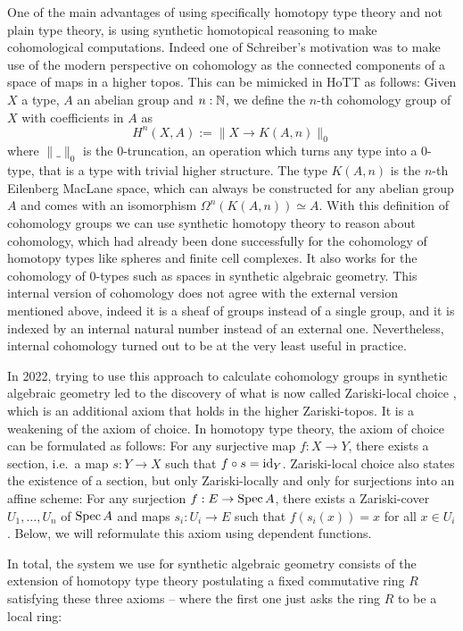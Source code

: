 One of the main advantages of using specifically homotopy type theory and not plain type theory, is using synthetic homotopical reasoning to make cohomological computations. Indeed one of Schreiber's motivation was to make use of the modern perspective on cohomology as the connected components of a space of maps in a higher topos. This can be mimicked in HoTT as follows: Given $X$ a type, $A$ an abelian group and $n:\mathbb{N}$, we define the $n$-th cohomology group of $X$ with coefficients in $A$ as
\[ H^n(X,A):=\| X\to K(A,n) \|_0\]
 where $\|\_\|_0$ is the $0$-truncation, an operation which turns any type into a $0$-type, that is a type with trivial higher structure. The type $K(A,n)$ is the $n$-th Eilenberg MacLane space, which can always be constructed for any abelian group $A$ and comes with an isomorphism $\Omega^n(K(A,n))\simeq A$.
With this definition of cohomology groups we can use synthetic homotopy theory to reason about cohomology, which had already been done successfully for the cohomology of homotopy types like spheres and finite cell complexes. It also works for the cohomology of $0$-types such as spaces in synthetic algebraic geometry.
This internal version of cohomology does not agree with the external version mentioned above, indeed it is a sheaf of groups instead of a single group, and it is indexed by an internal natural number instead of an external one. Nevertheless, internal cohomology turned out to be at the very least useful in practice.

In 2022, trying to use this approach to calculate cohomology groups in synthetic algebraic geometry led to the discovery of what is now called Zariski-local choice \cite{draft},
which is an additional axiom that holds in the higher Zariski-topos.
It is a weakening of the axiom of choice. In homotopy type theory, the axiom of choice can be formulated as follows: For any surjective map $f:X\to Y$, there exists a section, i.e.\ a map $s:Y\to X$ such that $f\circ s=\mathrm{id}_Y$.
Zariski-local choice also states the existence of a section, but only Zariski-locally and only for surjections into an affine scheme: For any surjection $f:E\to \operatorname{Spec} A$,
there exists a Zariski-cover $U_1,\dots,U_n$ of $\operatorname{Spec} A$ and maps $s_i:U_i\to E$ such that $f(s_i(x))=x$ for all $x\in U_i$.
Below, we will reformulate this axiom using dependent functions.

In total, the system we use for synthetic algebraic geometry consists of the extension of homotopy type theory postulating a fixed commutative ring $R$ satisfying these three axioms -- where the first one just asks the ring $R$ to be a local ring:

